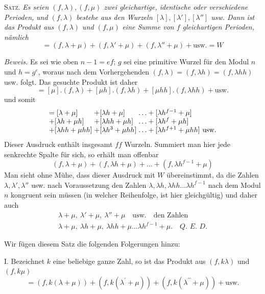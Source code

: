 \textsc{Satz.} \textit{Es seien \((f,\allowbreak \lambda),\allowbreak (f,\allowbreak \mu)\) zwei gleichartige, identische oder verschiedene Perioden,} \textit{und \((f,\allowbreak \lambda)\) bestehe aus den Wurzeln \([\lambda],\allowbreak [\lambda'],\allowbreak [\lambda'']\) usw. Dann ist das Produkt aus \((f,\allowbreak \lambda)\) und \((f,\allowbreak \mu)\)} \textit{eine Summe von \(f\) gleichartigen Perioden, nämlich} \[=(f,\lambda+\mu)+(f,\lambda'+\mu)+(f,\lambda''+\mu)+\mathrm{usw.}=W\]

\textit{Beweis.} Es sei wie oben \(n-1=ef\); \(g\) sei eine primitive Wurzel für den Modul \(n\) und \(h=g^e\), woraus nach dem Vorhergehenden \((f,\allowbreak \lambda)=(f,\allowbreak \lambda h)=(f,\allowbreak \lambda hh)\) usw. folgt. Das gesuchte Produkt ist daher \[=[\mu].(f,\lambda)+[\mu h].(f,\lambda h)+[\mu hh].(f,\lambda hh)+\mathrm{usw.}\] und somit \[\begin{array}{@{}l@{\;}l@{\;}l@{}}
=[\lambda+\mu]&+[\lambda h+\mu]&\ldots+[\lambda h^{f-1}+\mu]\\
+[\lambda h+\mu h]&+[\lambda hh+\mu h]&\ldots+[\lambda h^f+\mu h]\\
+[\lambda hh+\mu hh]&+[\lambda h^3+\mu hh]&\ldots+[\lambda h^{f+1}+\mu hh]\ \mathrm{usw.}
\end{array}\] Dieser Ausdruck enthält insgesamt \(ff\) Wurzeln. Summiert man hier jede senkrechte Spalte für sich, so erhält man offenbar \[(f,\lambda+\mu)+(f,\lambda h+\mu)+\ldots+(f,\lambda h^{f-1}+\mu)\] Man sieht ohne Mühe, dass dieser Ausdruck mit \(W\) übereinstimmt, da die Zahlen \(\lambda,\allowbreak \lambda',\allowbreak \lambda''\) usw. nach Voraussetzung den Zahlen \(\lambda,\allowbreak \lambda h,\allowbreak \lambda hh\ldots\lambda h^{f-1}\) nach dem Modul \(n\) kongruent sein müssen (in welcher Reihenfolge, ist hier gleichgültig) und daher auch \[\begin{gathered}
\lambda+\mu,\ \lambda'+\mu,\ \lambda''+\mu\quad\mathrm{usw.}\quad\text{den Zahlen}\\
\lambda+\mu,\ \lambda h+\mu,\ \lambda hh+\mu\ldots\lambda h^{f-1}+\mu.\quad\textit{Q. E. D.}
\end{gathered}\]

Wir fügen diesem Satz die folgenden Folgerungen hinzu:

I. Bezeichnet \(k\) eine beliebige ganze Zahl, so ist das Produkt aus \((f,\allowbreak k\lambda)\) und \((f,\allowbreak k\mu)\) \[=(f,k(\lambda+\mu))+(f,k(\lambda^{\prime}+\mu))+(f,k(\lambda^{\prime\prime}+\mu))+\text{usw.}\]

